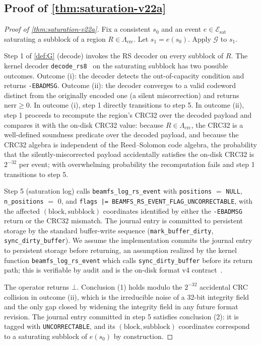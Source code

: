 \subsection{Proof of \cref{thm:saturation-v22a}}

\begin{proof}[Proof of \cref{thm:saturation-v22a}]
Fix a consistent \(s_0\) and an event
\(e \in \mathcal{E}_{\mathrm{sat}}\) saturating a subblock of a
region \(R \in \Lambda_{\mathrm{crc}}\). Let \(s_1 = e(s_0)\).
Apply \(\mathcal{G}\) to \(s_1\).

Step 1 of \cref{def:G} (decode) invokes the RS decoder on every
subblock of \(R\). The kernel decoder
\texttt{decode\_rs8}~\cite{kernelrslib} on the saturating
subblock has two possible outcomes. Outcome (i): the decoder
detects the out-of-capacity condition and returns
\texttt{-EBADMSG}. Outcome (ii): the decoder converges to a valid
codeword distinct from the originally encoded one (a silent
miscorrection) and returns \(\mathrm{nerr} \geq 0\). In outcome
(i), step 1 directly transitions to step 5. In outcome (ii),
step 1 proceeds to recompute the region's CRC32 over the decoded
payload and compares it with the on-disk CRC32 value: because
\(R \in \Lambda_{\mathrm{crc}}\), the CRC32 is a well-defined
soundness predicate over the decoded payload, and because the
CRC32 algebra is independent of the Reed--Solomon code algebra,
the probability that the silently-miscorrected payload accidentally
satisfies the on-disk CRC32 is \(2^{-32}\) per event; with
overwhelming probability the recomputation fails and step 1
transitions to step 5.

Step 5 (saturation log) calls \texttt{beamfs\_log\_rs\_event}
with \texttt{positions} \(=\) \texttt{NULL},
\texttt{n\_positions} \(=\) 0, and
\texttt{flags |= BEAMFS\_RS\_EVENT\_FLAG\_UNCORRECTABLE}, with
the affected \((\text{block}, \text{subblock})\) coordinates
identified by either the \texttt{-EBADMSG} return or the CRC32
mismatch. The journal entry is committed to persistent storage by
the standard buffer-write sequence (\texttt{mark\_buffer\_dirty},
\texttt{sync\_dirty\_buffer}). We assume the implementation
commits the journal entry to persistent storage before returning,
an assumption realized by the kernel function
\texttt{beamfs\_log\_rs\_event} which calls
\texttt{sync\_dirty\_buffer} before its return path; this is
verifiable by audit and is the on-disk format v4
contract~\cite{beamfs-impl}.

The operator returns \(\bot\). Conclusion (1) holds modulo the
\(2^{-32}\) accidental CRC collision in outcome (ii), which is
the irreducible noise of a 32-bit integrity field and the only
gap closed by widening the integrity field in any future format
revision. The journal entry committed in step 5 satisfies
conclusion (2): it is tagged with \texttt{UNCORRECTABLE}, and
its \((\text{block}, \text{subblock})\) coordinates correspond
to a saturating subblock of \(e(s_0)\) by construction.
\end{proof}

